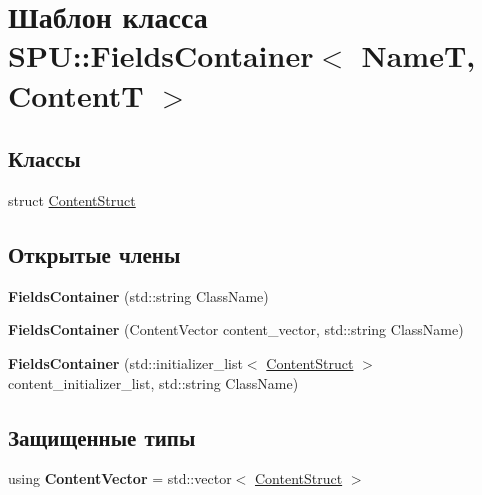 \hypertarget{class_s_p_u_1_1_fields_container}{}\section{Шаблон класса S\+PU\+:\+:Fields\+Container$<$ NameT, ContentT $>$}
\label{class_s_p_u_1_1_fields_container}
\subsection*{Классы}
\begin{DoxyCompactItemize}
\item 
struct \hyperlink{struct_s_p_u_1_1_fields_container_1_1_content_struct}{Content\+Struct}
\end{DoxyCompactItemize}
\subsection*{Открытые члены}
\begin{DoxyCompactItemize}
\item 
\mbox{\label{class_s_p_u_1_1_fields_container_a53cf876b033420234d132395597eda7b}} 
{\bfseries Fields\+Container} (std\+::string Class\+Name)
\item 
\mbox{\label{class_s_p_u_1_1_fields_container_aa3d1f42625ef5c8f4f6440f4c4df4eff}} 
{\bfseries Fields\+Container} (Content\+Vector content\+\_\+vector, std\+::string Class\+Name)
\item 
\mbox{\label{class_s_p_u_1_1_fields_container_a78bfa78d1c48cf6659552a36354f751d}} 
{\bfseries Fields\+Container} (std\+::initializer\+\_\+list$<$ \hyperlink{struct_s_p_u_1_1_fields_container_1_1_content_struct}{Content\+Struct} $>$ content\+\_\+initializer\+\_\+list, std\+::string Class\+Name)
\end{DoxyCompactItemize}
\subsection*{Защищенные типы}
\begin{DoxyCompactItemize}
\item 
\mbox{\label{class_s_p_u_1_1_fields_container_ad1bff37d859918d4a7552d78fd7d3a30}} 
using {\bfseries Content\+Vector} = std\+::vector$<$ \hyperlink{struct_s_p_u_1_1_fields_container_1_1_content_struct}{Content\+Struct} $>$
\end{DoxyCompactItemize}

